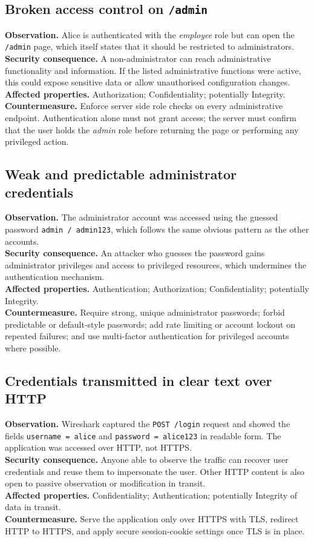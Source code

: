 \subsection{Broken access control on \texttt{/admin}}
\textbf{Observation.} Alice is authenticated with the \emph{employee} role but
can open the \texttt{/admin} page, which itself states that it should be
restricted to administrators.\\
\textbf{Security consequence.} A non-administrator can reach administrative
functionality and information. If the listed administrative functions were
active, this could expose sensitive data or allow unauthorised configuration
changes.\\
\textbf{Affected properties.} Authorization; Confidentiality; potentially
Integrity.\\
\textbf{Countermeasure.} Enforce server side role checks on every
administrative endpoint. Authentication alone must not grant access; the server
must confirm that the user holds the \emph{admin} role before returning the page
or performing any privileged action.

\subsection{Weak and predictable administrator credentials}
\textbf{Observation.} The administrator account was accessed using the guessed
password \texttt{admin / admin123}, which follows the same obvious pattern as
the other accounts.\\
\textbf{Security consequence.} An attacker who guesses the password gains
administrator privileges and access to privileged resources, which undermines
the authentication mechanism.\\
\textbf{Affected properties.} Authentication; Authorization; Confidentiality;
potentially Integrity.\\
\textbf{Countermeasure.} Require strong, unique administrator passwords; forbid
predictable or default-style passwords; add rate limiting or account lockout on
repeated failures; and use multi-factor authentication for privileged accounts
where possible.

\subsection{Credentials transmitted in clear text over HTTP}
\textbf{Observation.} Wireshark captured the \texttt{POST /login} request and
showed the fields \texttt{username = alice} and \texttt{password = alice123} in
readable form. The application was accessed over HTTP, not HTTPS.\\
\textbf{Security consequence.} Anyone able to observe the traffic can recover
user credentials and reuse them to impersonate the user. Other HTTP content is
also open to passive observation or modification in transit.\\
\textbf{Affected properties.} Confidentiality; Authentication; potentially
Integrity of data in transit.\\
\textbf{Countermeasure.} Serve the application only over HTTPS with TLS,
redirect HTTP to HTTPS, and apply secure session-cookie settings once TLS is in
place.

